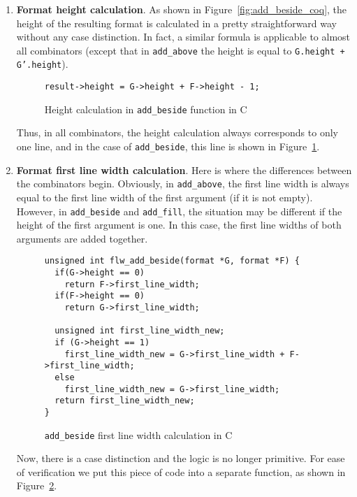 \documentclass[14pt]{constructor-diploma}
\begin{document}
\begin{enumerate}
  \item \textbf{Format height calculation}. As shown in Figure~\ref{fig:add_beside_coq}, the height of the resulting format is calculated 
  in a pretty straightforward way without any case distinction.
  In fact, a similar formula is applicable to almost all combinators (except that in \texttt{add\_above} the height is equal to \texttt{G.height + G'.height}). 
\begin{figure}[H]
\begin{mdframed}[backgroundcolor=bg]
\begin{verbatim}
result->height = G->height + F->height - 1;
\end{verbatim}
\end{mdframed}
\caption{Height calculation in \texttt{add\_beside} function in C}
\label{fig:height_calculation}
\end{figure}
  Thus, in all combinators, the height calculation always corresponds to only one line, and in the case of \texttt{add\_beside}, this line is shown in Figure~\ref{fig:height_calculation}.

  \item \textbf{Format first line width calculation}. Here is where the differences between the combinators begin. 
  Obviously, in \texttt{add\_above}, the first line width is always equal to the first line width of the first argument (if it is not empty). 
  However, in \texttt{add\_beside} and \texttt{add\_fill}, the situation may be different if the height of the first argument is one. 
  In this case, the first line widths of both arguments are added together.
\begin{figure}[H]
\begin{mdframed}[backgroundcolor=bg]
\begin{verbatim}
unsigned int flw_add_beside(format *G, format *F) {
  if(G->height == 0)
    return F->first_line_width;
  if(F->height == 0)
    return G->first_line_width;

  unsigned int first_line_width_new;
  if (G->height == 1)
    first_line_width_new = G->first_line_width + F->first_line_width;
  else
    first_line_width_new = G->first_line_width;
  return first_line_width_new;
}
\end{verbatim}
\end{mdframed}
\caption{\texttt{add\_beside} first line width calculation in C}
\label{fig:flw_calculation}
\end{figure}
  Now, there is a case distinction and the logic is no longer primitive. For ease of verification we put this piece of code into a separate function, as shown in Figure~\ref{fig:flw_calculation}.


\end{enumerate}
\end{document}
